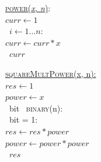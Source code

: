 \documentclass[aspectratio=169]{beamer}
\begin{document}
\begin{frame}{}
\begin{figure}[htbp]
 \begin{minipage}{0.5\linewidth}
  \centering
    \begin{nalgo}
        \underline{\textsc{power}(\emph{x, n})}:\+
    \\\label{}  $curr \gets 1$
    \\\label{}  \for\ $i \gets 1 \ldots n:$\+
    \\\label{}      $curr \gets curr * x$\-
    \\\label{}  \return\ $curr$
    \end{nalgo}
 \end{minipage}%
 \pause %
 \begin{minipage}{0.5\linewidth}
  \centering
    \begin{nalgo}
        \underline{\textsc{squareMultPower}(x, n):}\+
    \\\label{}      $res \gets 1$
    \\\label{}      $power \gets x$
    \\\label{}      \for\ bit \iin\ \textsc{binary}(n):\+
    \\\label{}          \iif\ bit = 1:\+
    \\\label{}              $res \gets res * power$\-
    \\\label{}          $power \gets power * power$\-
    \\\label{}      \return\ $res$
    \end{nalgo}
 \end{minipage}
\end{figure} 
\end{frame}
\end{document}
